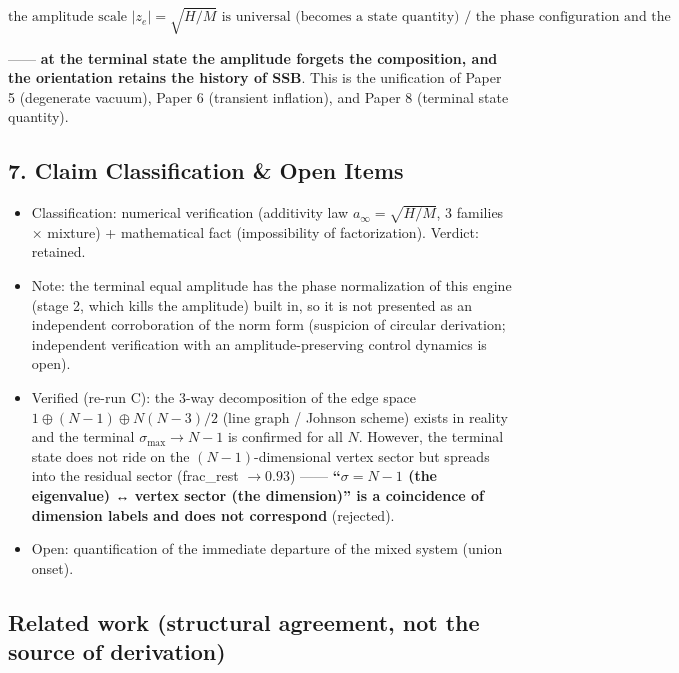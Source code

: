 \documentclass[
  a4paper,
]{ltjsarticle}
\providecommand{\tightlist}{%
  \setlength{\itemsep}{0pt}\setlength{\parskip}{0pt}}
\begin{document}
\[\boxed{\text{the amplitude scale }|z_e|=\sqrt{H/M}\text{ is universal (becomes a state quantity) / the phase configuration and the orientation of the face are degenerate and selected by the seed (retain the SSB history)}}\]

------ \textbf{at the terminal state the amplitude forgets the
composition, and the orientation retains the history of SSB}. This is
the unification of Paper 5 (degenerate vacuum), Paper 6 (transient
inflation), and Paper 8 (terminal state quantity).

\subsection{7. Claim Classification \& Open
Items}\label{claim-classification-open-items}

\begin{itemize}
\tightlist
\item
  Classification: numerical verification (additivity law
  \(a_\infty=\sqrt{H/M}\), 3 families × mixture) + mathematical fact
  (impossibility of factorization). Verdict: retained.
\item
  Note: the terminal equal amplitude has the phase normalization of this
  engine (stage 2, which kills the amplitude) built in, so it is not
  presented as an independent corroboration of the norm form (suspicion
  of circular derivation; independent verification with an
  amplitude-preserving control dynamics is open).
\item
  Verified (re-run C): the 3-way decomposition of the edge space
  \(1\oplus(N-1)\oplus N(N-3)/2\) (line graph / Johnson scheme) exists
  in reality and the terminal \(\sigma_{\max}\to N-1\) is confirmed for
  all \(N\). However, the terminal state does not ride on the
  \((N-1)\)-dimensional vertex sector but spreads into the residual
  sector (frac\_rest \(\to0.93\)) ------ \textbf{``\(\sigma=N-1\) (the
  eigenvalue) ↔ vertex sector (the dimension)'' is a coincidence of
  dimension labels and does not correspond} (rejected).
\item
  Open: quantification of the immediate departure of the mixed system
  (union onset).
\end{itemize}

\subsection{Related work (structural agreement, not the source of
derivation)}\label{related-work-structural-agreement-not-the-source-of-derivation}
\end{document}
